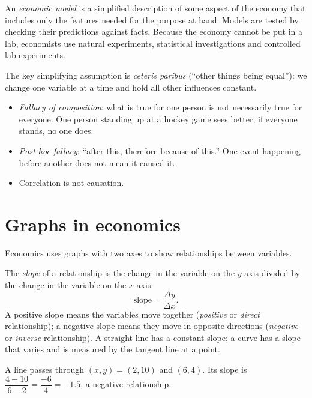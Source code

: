 An \emph{economic model} is a simplified description of some aspect of the economy that
includes only the features needed for the purpose at hand. Models are tested by checking
their predictions against facts. Because the economy cannot be put in a lab, economists
use natural experiments, statistical investigations and controlled lab experiments.

The key simplifying assumption is \emph{ceteris paribus} (``other things being equal''):
we change one variable at a time and hold all other influences constant.

\begin{important}
\begin{itemize}
  \item \emph{Fallacy of composition}: what is true for one person is not necessarily true
        for everyone. One person standing up at a hockey game sees better; if everyone
        stands, no one does.
  \item \emph{Post hoc fallacy}: ``after this, therefore because of this.'' One event
        happening before another does not mean it caused it.
  \item Correlation is not causation.
\end{itemize}
\end{important}

\section{Graphs in economics}

Economics uses graphs with two axes to show relationships between variables.

\begin{definition}[Slope]
The \emph{slope} of a relationship is the change in the variable on the $y$-axis divided
by the change in the variable on the $x$-axis:
\[
  \text{slope} = \frac{\Delta y}{\Delta x}.
\]
A positive slope means the variables move together (\emph{positive} or \emph{direct}
relationship); a negative slope means they move in opposite directions (\emph{negative}
or \emph{inverse} relationship). A straight line has a constant slope; a curve has a
slope that varies and is measured by the tangent line at a point.
\end{definition}

\begin{example}
A line passes through $(x,y) = (2, 10)$ and $(6, 4)$. Its slope is
$\dfrac{4 - 10}{6 - 2} = \dfrac{-6}{4} = -1.5$, a negative relationship.
\end{example}

